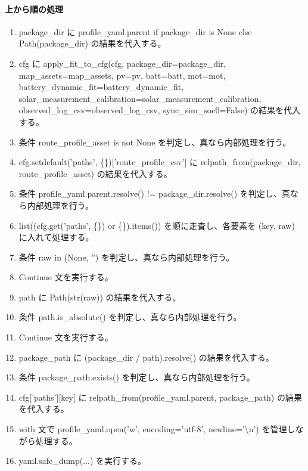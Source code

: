 \documentclass[a4paper,11pt]{article}
\begin{document}
            \paragraph{上から順の処理}
            \begin{enumerate}[leftmargin=1.8em]
            \item package\_dir に profile\_yaml.parent if package\_dir is None else Path(package\_dir) の結果を代入する。
\item cfg に apply\_fit\_to\_cfg(cfg, package\_dir=package\_dir, map\_assets=map\_assets, pv=pv, batt=batt, mot=mot, battery\_dynamic\_fit=battery\_dynamic\_fit, solar\_measurement\_calibration=solar\_measurement\_calibration, observed\_log\_csv=observed\_log\_csv, sync\_sim\_soc0=False) の結果を代入する。
\item 条件 route\_profile\_asset is not None を判定し、真なら内部処理を行う。
\item   cfg.setdefault('paths', \{\})['route\_profile\_csv'] に relpath\_from(package\_dir, route\_profile\_asset) の結果を代入する。
\item 条件 profile\_yaml.parent.resolve() != package\_dir.resolve() を判定し、真なら内部処理を行う。
\item   list((cfg.get('paths', \{\}) or \{\}).items()) を順に走査し、各要素を (key, raw) に入れて処理する。
\item     条件 raw in (None, '') を判定し、真なら内部処理を行う。
\item       Continue 文を実行する。
\item     path に Path(str(raw)) の結果を代入する。
\item     条件 path.is\_absolute() を判定し、真なら内部処理を行う。
\item       Continue 文を実行する。
\item     package\_path に (package\_dir / path).resolve() の結果を代入する。
\item     条件 package\_path.exists() を判定し、真なら内部処理を行う。
\item       cfg['paths'][key] に relpath\_from(profile\_yaml.parent, package\_path) の結果を代入する。
\item with 文で profile\_yaml.open('w', encoding='utf-8', newline='\textbackslash{}n') を管理しながら処理する。
\item   yaml.safe\_dump(...) を実行する。
            \end{enumerate}
\end{document}
